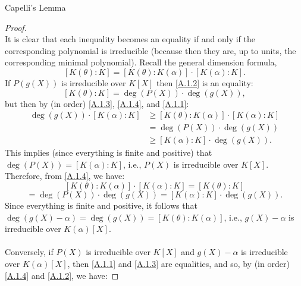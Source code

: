 \begin{appendixitem}{Capelli's Lemma}
\begin{proof}
\begin{equation}
        \end{equation}
        It is clear that each inequality becomes an equality if and only if the corresponding polynomial is irreducible (because then they are, up to units, the corresponding minimal polynomial). Recall the general dimension formula,
        \begin{equation}
            \label{A.1.4} \tag{4} \left[ K\left(\theta\right) : K \right] = \left[ K\left(\theta\right) : K\left(\alpha\right) \right] \cdot \left[ K\left(\alpha\right) : K \right].
        \end{equation}
        If \( P\left(g\left(X\right)\right) \) is irreducible over \( K\left[X\right] \) then \eqref{A.1.2} is an equality:
        \[
            \left[ K\left(\theta\right) : K \right] = \deg\left( P\left(X\right) \right) \cdot \deg\left( g\left(X\right) \right),
        \]
        but then by (in order) \eqref{A.1.3}, \eqref{A.1.4}, and \eqref{A.1.1}:
        \begin{align*}
            \deg\left( g(X) \right)\cdot \left[ K(\alpha) : K \right] &\geq \left[ K(\theta) : K(\alpha) \right] \cdot \left[ K(\alpha) : K \right] \\
            &= \deg\left( P(X) \right) \cdot \deg\left( g(X) \right) \\
            &\geq \left[ K(\alpha) : K \right]\cdot \deg\left( g(X) \right).
        \end{align*}
        This implies (since everything is finite and positive) that \( \deg\left( P\left(X\right) \right) = \left[ K\left(\alpha\right) : K \right] \), i.e., \( P\left(X\right) \) is irreducible over \( K\left[X\right] \). Therefore, from \eqref{A.1.4}, we have:
        \[
            \left[ K\left(\theta\right) : K\left(\alpha\right) \right] \cdot \left[ K\left(\alpha\right) : K \right] = \left[ K\left(\theta\right) : K \right]
        \]
        \[
            = \deg\left( P\left(X\right) \right) \cdot \deg\left( g\left(X\right) \right) = \left[ K\left(\alpha\right) : K \right] \cdot \deg\left( g\left(X\right) \right).
        \]
        Since everything is finite and positive, it follows that \( \deg\left( g\left(X\right) - \alpha \right) = \deg\left( g\left(X\right) \right) = \left[ K\left(\theta\right) : K\left(\alpha\right) \right] \), i.e., \( g\left(X\right) - \alpha \) is irreducible over \( K\left(\alpha\right)\left[X\right] \).
        \\\\
        Conversely, if \( P\left(X\right) \) is irreducible over \( K\left[X\right] \) and \( g\left(X\right) - \alpha \) is irreducible over \( K\left(\alpha\right)\left[X\right] \), then \eqref{A.1.1} and \eqref{A.1.3} are equalities, and so, by (in order) \eqref{A.1.4} and \eqref{A.1.2}, we have:

\end{proof}
\end{appendixitem}
